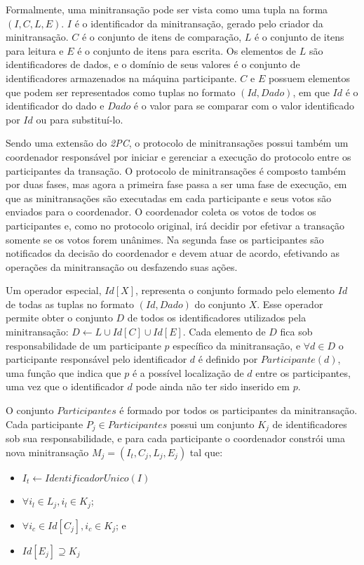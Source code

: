 \documentclass[11pt,twoside,a4paper]{book}
\begin{document}
Formalmente, uma minitransação pode ser vista como uma tupla na forma $(I, C, L, E)$. $I$ é o identificador da minitransação, gerado pelo criador da minitransação. \(C\) é o conjunto de itens de comparação, \(L\) é o conjunto de itens para leitura e \(E\) é o conjunto de itens para escrita. Os elementos de \(L\) são identificadores de dados, e o domínio de seus valores é o conjunto de identificadores armazenados na máquina participante. \(C\) e \(E\) possuem elementos que podem ser representados como tuplas no formato \((Id, Dado)\), em que \(Id\) é o identificador do dado e \(Dado\) é o valor para se comparar com o valor identificado por $Id$ ou para substituí-lo.

Sendo uma extensão do \emph{2PC}, o protocolo de minitransações possui também um coordenador responsável por iniciar e gerenciar a execução do protocolo entre os participantes da transação. O protocolo de minitransações é composto também por duas fases, mas agora a primeira fase passa a ser uma fase de execução, em que as minitransações são executadas em cada participante e seus votos são enviados para o coordenador. O coordenador coleta os votos de todos os participantes e, como no protocolo original, irá decidir por efetivar a transação somente se os votos forem unânimes. Na segunda fase os participantes são notificados da decisão do coordenador e devem atuar de acordo, efetivando as operações da minitransação ou desfazendo suas ações.

Um operador especial, $Id[X]$, representa o conjunto formado pelo elemento $Id$ de todas as tuplas no formato $(Id, Dado)$ do conjunto $X$. Esse operador permite obter o conjunto $D$ de todos os identificadores utilizados pela minitransação: $D \gets L \cup Id[C] \cup Id[E]$. Cada elemento de $D$ fica sob responsabilidade de um participante $p$ específico da minitransação, e $\forall d \in D$ o participante responsável pelo identificador $d$ é definido por $Participante(d)$, uma função que indica que $p$ é a possível localização de $d$ entre os participantes, uma vez que o identificador $d$ pode ainda não ter sido inserido em $p$.

O conjunto $Participantes$ é formado por todos os participantes da minitransação. Cada participante $P_j \in Participantes$ possui um conjunto $K_j$ de identificadores sob sua responsabilidade, e para cada participante o coordenador constrói uma nova minitransação \(M_j = (I_t, C_j, L_j, E_j)\) tal que:

\begin{itemize}
    \item $I_t \gets IdentificadorUnico(I)$
    \item $\forall i_l \in L_j, i_l \in K_j$;
    \item $\forall i_c \in Id[C_j], i_c \in K_j$; e
    \item $Id[E_j] \supseteq K_j$
\end{itemize}
\end{document}
